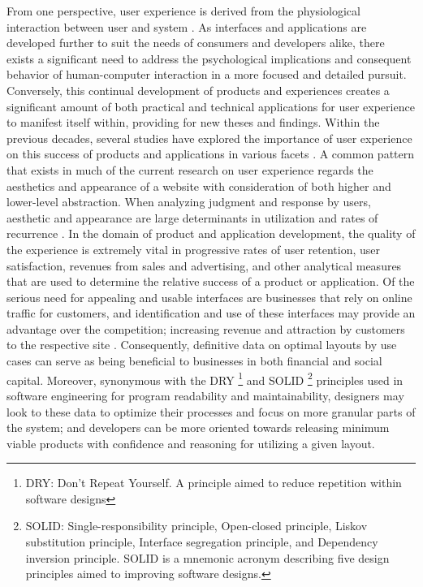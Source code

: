 \documentclass[conference]{IEEEtran}
\begin{document}
From one perspective, user experience is derived from the physiological interaction between user and system \cite{10.1145/2688203}. As interfaces and applications are developed further to suit the needs of consumers and developers alike, there exists a significant need to address the psychological implications and consequent behavior of human-computer interaction in a more focused and detailed pursuit. Conversely, this continual development of products and experiences creates a significant amount of both practical and technical applications for user experience to manifest itself within, providing for new theses and findings. Within the previous decades, several studies have explored the importance of user experience on this success of products and applications in various facets \cite{doi:10.1080/07370024.2011.646927, mousetracking, parallax}. A common pattern that exists in much of the current research on user experience regards the aesthetics and appearance of a website with consideration of both higher and lower-level abstraction. When analyzing judgment and response by users, aesthetic and appearance are large determinants in utilization and rates of recurrence \cite{10.1145/3206025.3206039}. In the domain of product and application development, the quality of the experience is extremely vital in progressive rates of user retention, user satisfaction, revenues from sales and advertising, and other analytical measures that are used to determine the relative success of a product or application. Of the serious need for appealing and usable interfaces are businesses that rely on online traffic for customers, and identification and use of these interfaces may provide an advantage over the competition; increasing revenue and attraction by customers to the respective site \cite{10.1145/3206025.3206039}. Consequently, definitive data on optimal layouts by use cases can serve as being beneficial to businesses in both financial and social capital. Moreover, synonymous with the DRY \footnote{DRY: Don't Repeat Yourself. A principle aimed to reduce repetition within software designs} and SOLID \footnote{SOLID: Single-responsibility principle, Open-closed principle, Liskov substitution principle, Interface segregation principle, and Dependency inversion principle. SOLID is a mnemonic acronym describing five design principles aimed to improving software designs.} principles used in software engineering for program readability and maintainability, designers may look to these data to optimize their processes and focus on more granular parts of the system; and developers can be more oriented towards releasing minimum viable products with confidence and reasoning for utilizing a given layout.
\end{document}
